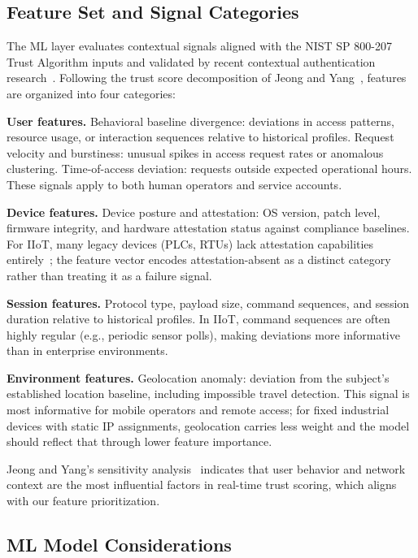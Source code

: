 \documentclass[conference]{IEEEtran}
\begin{document}
\subsection{Feature Set and Signal Categories}

The ML layer evaluates contextual signals aligned with the NIST SP 800-207 Trust Algorithm inputs and validated by recent contextual authentication research~\cite{mahansaria2024, xiao2022}. Following the trust score decomposition of Jeong and Yang~\cite{jeong2025}, features are organized into four categories:

\textbf{User features.} Behavioral baseline divergence: deviations in access patterns, resource usage, or interaction sequences relative to historical profiles. Request velocity and burstiness: unusual spikes in access request rates or anomalous clustering. Time-of-access deviation: requests outside expected operational hours. These signals apply to both human operators and service accounts.

\textbf{Device features.} Device posture and attestation: OS version, patch level, firmware integrity, and hardware attestation status against compliance baselines. For IIoT, many legacy devices (PLCs, RTUs) lack attestation capabilities entirely~\cite{ehrlich2021}; the feature vector encodes attestation-absent as a distinct category rather than treating it as a failure signal.

\textbf{Session features.} Protocol type, payload size, command sequences, and session duration relative to historical profiles. In IIoT, command sequences are often highly regular (e.g., periodic sensor polls), making deviations more informative than in enterprise environments.

\textbf{Environment features.} Geolocation anomaly: deviation from the subject's established location baseline, including impossible travel detection. This signal is most informative for mobile operators and remote access; for fixed industrial devices with static IP assignments, geolocation carries less weight and the model should reflect that through lower feature importance.

Jeong and Yang's sensitivity analysis~\cite{jeong2025} indicates that user behavior and network context are the most influential factors in real-time trust scoring, which aligns with our feature prioritization.

\subsection{ML Model Considerations}
\end{document}
